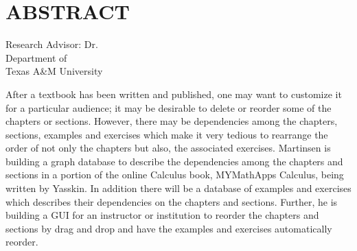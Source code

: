 %
%
%
%

\chapter*{ABSTRACT}


\pagestyle{plain} %
\setcounter{page}{1}
\begin{center}

\begin{singlespace}
\abstracttitle
\end{singlespace}
\vspace{2em}
\vspace{2em}
\begin{singlespace}
Research Advisor: Dr. \ursadvisor \\
Department of \advisordepartment \\
Texas A\&M University \\
\end{singlespace}
\end{center}
\vspace{2em}

\indent After a textbook has been written and published, one may want to customize it for a particular audience; it may be desirable to delete or reorder some of the chapters or sections. However, there may be dependencies among the chapters, sections, examples and exercises which make it very tedious to rearrange the order of not only the chapters but also, the associated exercises. Martinsen is building a graph database to describe the dependencies among the chapters and sections in a portion of the online Calculus book, MYMathApps Calculus, being written by Yasskin. In addition there will be a database of examples and exercises which describes their dependencies on the chapters and sections. Further, he is building a GUI for an instructor or institution to reorder the chapters and sections by drag and drop and have the examples and exercises automatically reorder.

\pagebreak{}
